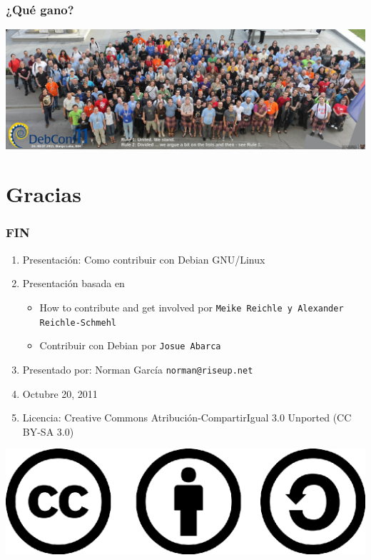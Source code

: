 \documentclass{beamer}
\begin{document}
\begin{frame} 
\frametitle{¿Qu\'e gano?}
                 \includegraphics[scale=0.30]{../img/dc11photogroup.jpg}
\end{frame}


\section{Gracias}


\begin{frame}
\frametitle{FIN}
	\begin{enumerate}
		\pause \item Presentaci\'on: Como contribuir con Debian GNU/Linux
		\pause \item Presentaci\'on basada en
			\begin{itemize}
				\pause \item How to contribute and get involved por \texttt{Meike Reichle y Alexander Reichle-Schmehl}
				\pause \item Contribuir con Debian por \texttt{Josue Abarca}
			\end{itemize}
		\pause \item Presentado por: Norman Garc\'ia  \texttt{norman@riseup.net}
		\pause \item Octubre 20, 2011
		\pause \item Licencia: Creative Commons Atribuci\'on-CompartirIgual 3.0 Unported (CC BY-SA 3.0)
	\end{enumerate}

	\begin{center}
  		 \includegraphics[scale=0.20]{../img/cclogo.png}
	\end{center}

\end{frame}
\end{document}
